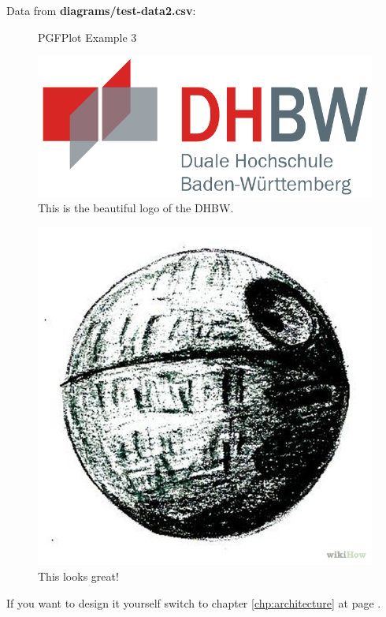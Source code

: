 Data from \textbf{diagrams/test-data2.csv}:

\begin{figure}[H]
\loadTestData
{}
	\caption[PGFPlot 3]{PGFPlot Example 3}
	\label{fig:pgf:example3}
\end{figure}

\begin{figure}[H]
	\centering
	\includegraphics[width=\textwidth,scale=0.6]{images/dhbw.png}
	\caption[DHBW]{This is the beautiful logo of the DHBW.}
	\label{fig:dhbw_logo}
\end{figure}
\begin{figure}[H]
	\centering
	\includegraphics[scale=0.4]{images/death-star.jpg}
	\caption[Death Star]{This looks great! \cite{fig:deathstar}}
	\label{fig:dhbw_logo}
\end{figure}
If you want to design it yourself switch to chapter \ref{chp:architecture} at page \pageref{chp:architecture}.

